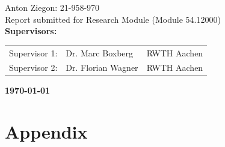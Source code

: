 \documentclass[11pt]{article}%
\begin{document}
\begin{titlepage}
\begin{center}
{Anton Ziegon: 21-958-970} \\[20mm]
{Report submitted for Research Module (Module 54.12000)} \\[20mm]


\textbf{Supervisors:}\\[5mm]
\begin{tabular}{lll}

Supervisor 1: & Dr. Marc Boxberg & RWTH Aachen\\
Supervisor 2: & Dr. Florian Wagner & RWTH Aachen\\ [20mm]

\end{tabular}
\end{center}

\begin{center}
   \Large\textbf{\today} 
\end{center}
\end{titlepage}

\newpage











\newpage
\printbibliography
\newpage


\newpage
\appendix
\section{Appendix}
\setcounter{figure}{0} 


\newpage

%
%


%
\end{document}

